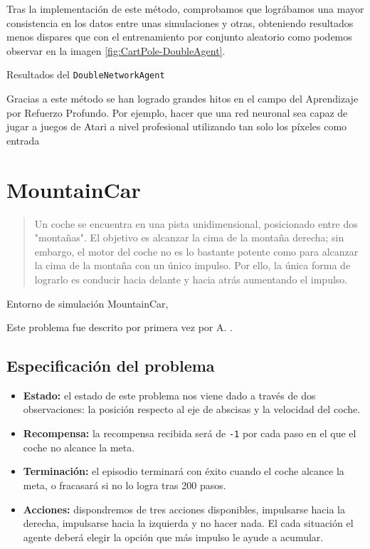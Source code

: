 Tras la implementación de este método, comprobamos que lográbamos una mayor consistencia en los datos entre unas simulaciones y otras, obteniendo resultados menos dispares que con el entrenamiento por conjunto aleatorio como podemos observar en la imagen \ref{fig:CartPole-DoubleAgent}.

%
       {Resultados del \texttt{DoubleNetworkAgent}}

Gracias a este método se han logrado grandes hitos en el campo del Aprendizaje por Refuerzo Profundo. Por ejemplo, hacer que una red neuronal sea capaz de jugar a juegos de Atari a nivel profesional utilizando tan solo los píxeles como entrada \citep{mnih2013playing}


\section{MountainCar}

\begin{quote}
    Un coche se encuentra en una pista unidimensional, posicionado entre dos "montañas". El objetivo es alcanzar la cima de la montaña derecha; sin embargo, el motor del coche no es lo bastante potente como para alcanzar la cima de la montaña con un único impulso. Por ello, la única forma de lograrlo es conducir hacia delante y hacia atrás aumentando el impulso.
\end{quote}

%
       {Entorno de simulación MountainCar, \citet{brockman2016openai}}

Este problema fue descrito por primera vez por A. \citet{Moore90efficientmemory-based}.

\subsection{Especificación del problema}

\begin{itemize}
    \item \textbf{Estado:} el estado de este problema nos viene dado a través de dos observaciones: la posición respecto al eje de abscisas y la velocidad del coche.
    \item \textbf{Recompensa:} la recompensa recibida será de \texttt{-1} por cada paso en el que el coche no alcance la meta.
    \item \textbf{Terminación:} el episodio terminará con éxito cuando el coche alcance la meta, o fracasará si no lo logra tras 200 pasos.
    \item \textbf{Acciones:} dispondremos de tres acciones disponibles, impulsarse hacia la derecha, impulsarse hacia la izquierda y no hacer nada. El cada situación el agente deberá elegir la opción que más impulso le ayude a acumular.
\end{itemize}

